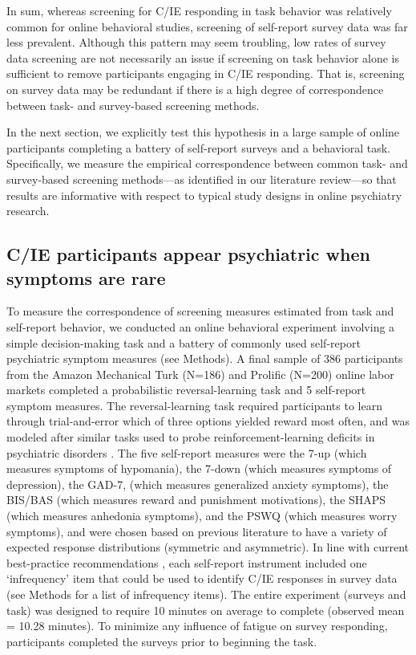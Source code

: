 \documentclass[a4paper,notitlepage,12pt]{article}
\begin{document}
In sum, whereas screening for C/IE responding in task behavior was relatively common for online behavioral studies, screening of self-report survey data was far less prevalent. Although this pattern may seem troubling, low rates of survey data screening are not necessarily an issue if screening on task behavior alone is sufficient to remove participants engaging in C/IE responding. That is, screening on survey data may be redundant if there is a high degree of correspondence between task- and survey-based screening methods. 

In the next section, we explicitly test this hypothesis in a large sample of online participants completing a battery of self-report surveys and a behavioral task. Specifically, we measure the empirical correspondence between common task- and survey-based screening methods---as identified in our literature review---so that results are informative with respect to typical study designs in online psychiatry research.

\subsection*{C/IE participants appear psychiatric when symptoms are rare}

To measure the correspondence of screening measures estimated from task and self-report behavior, we conducted an online behavioral experiment involving a simple decision-making task and a battery of commonly used self-report psychiatric symptom measures (see Methods). A final sample of 386 participants from the Amazon Mechanical Turk (N=186) and Prolific (N=200) online labor markets completed a probabilistic reversal-learning task and 5 self-report symptom measures. The reversal-learning task required participants to learn through trial-and-error which of three options yielded reward most often, and was modeled after similar tasks used to probe reinforcement-learning deficits in psychiatric disorders \cite{waltz2007probabilistic, mukherjee_reward_2020}. The five self-report measures were the 7-up (which measures symptoms of hypomania), the 7-down (which measures symptoms of depression), the GAD-7, (which measures generalized anxiety symptoms), the BIS/BAS (which measures reward and punishment motivations), the SHAPS (which measures anhedonia symptoms), and the PSWQ (which measures worry symptoms), and were chosen based on previous literature to have a variety of expected response distributions (symmetric and asymmetric). In line with current best-practice recommendations \cite{huang2015detecting}, each self-report instrument included one `infrequency' item that could be used to identify C/IE responses in survey data (see Methods for a list of infrequency items). The entire experiment (surveys and task) was designed to require 10 minutes on average to complete (observed mean = 10.28 minutes). To minimize any influence of fatigue on survey responding, participants completed the surveys prior to beginning the task.
\end{document}
